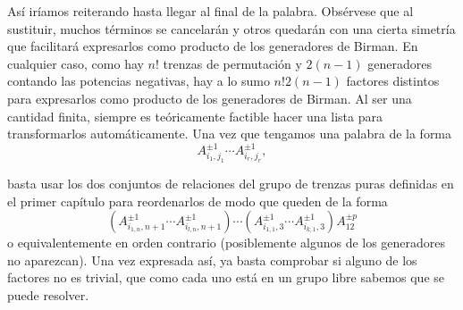 \documentclass[TFG.tex]{subfiles}
\begin{document}

Así iríamos reiterando hasta llegar al final de la palabra. Obsérvese que al sustituir, muchos términos se cancelarán y otros quedarán con una cierta simetría que facilitará expresarlos como producto de los generadores de Birman. En cualquier caso, como hay $n!$ trenzas de permutación y $2(n-1)$ generadores contando las potencias negativas, hay a lo sumo $n!2(n-1)$ factores distintos para expresarlos como producto de los generadores de Birman. Al ser una cantidad finita, siempre es teóricamente factible hacer una lista para transformarlos automáticamente. Una vez que tengamos una palabra de la forma
\[
A_{i_1,j_1}^{\pm 1}\cdots A_{i_r,j_r}^{\pm 1},
\]

basta usar los dos conjuntos de relaciones del grupo de trenzas puras definidas en el primer capítulo para reordenarlos de modo que queden de la forma
\[
(A_{i_{1,n},n+1}^{\pm 1}\cdots A_{i_{l,n},n+1}^{\pm 1})\cdots(A_{i_{1,1},3}^{\pm 1}\cdots A_{i_{k,1},3}^{\pm 1}) A_{12}^{\pm p}
\]
o equivalentemente en orden contrario (posiblemente algunos de los generadores no aparezcan). Una vez expresada así, ya basta comprobar si alguno de los factores no es trivial, que como cada uno está en un grupo libre sabemos que se puede resolver.
\end{document}
